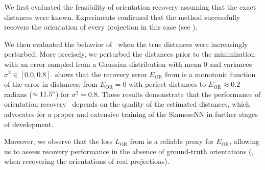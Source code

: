 We first evaluated the feasibility of orientation recovery assuming that the exact distances were known.
Experiments confirmed that the method successfully recovers the orientation of every projection in this case (see ).

We then evaluated the behavior of~ when the true distances were increasingly perturbed.
More precisely, we perturbed the distances prior to the minimization with an error sampled from a Gaussian distribution with mean $0$ and variances $\sigma^2 \in [0.0, 0.8]$.
 shows that the recovery error $E_\text{OR}$ from  is a monotonic function of the error in distances: from $E_\text{OR} = 0$ with perfect distances to $E_\text{OR} \approx 0.2$ radians ($\approx 11.5\degree$) for $\sigma^2 = 0.8$.
These results demonstrate that the performance of orientation recovery~ depends on the quality of the estimated distances, which advocates for a proper and extensive training of the SiameseNN in further stages of development.

Moreover, we observe that the loss $L_\text{OR}$ from  is a reliable proxy for $E_\text{OR}$, allowing us to assess recovery performance in the absence of ground-truth orientations (\ie, when recovering the orientations of real projections).

